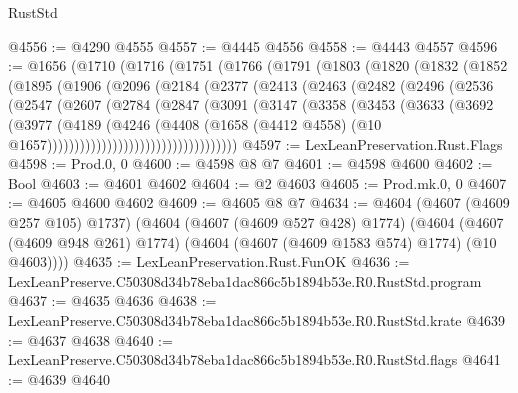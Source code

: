 \begin{lexlean}{RustStd}
\begin{coremodule}
@4556 := @4290 @4555
@4557 := @4445 @4556
@4558 := @4443 @4557
@4596 := @1656
    (@1710
      (@1716
        (@1751
          (@1766
            (@1791
              (@1803
                (@1820
                  (@1832
                    (@1852
                      (@1895
                        (@1906
                          (@2096
                            (@2184
                              (@2377
                                (@2413
                                  (@2463
                                    (@2482
                                      (@2496
                                        (@2536
                                          (@2547
                                            (@2607
                                              (@2784
                                                (@2847
                                                  (@3091
                                                    (@3147
                                                      (@3358
                                                        (@3453
                                                          (@3633
                                                            (@3692
                                                              (@3977
                                                                (@4189
                                                                  (@4246
                                                                    (@4408
                                                                      (@1658
                                                                        (@4412 @4558)
                                                                        (@10
                                                                          @1657)))))))))))))))))))))))))))))))))))
@4597 := LexLeanPreservation.Rust.Flags
@4598 := Prod.{0, 0}
@4600 := @4598 @8 @7
@4601 := @4598 @4600
@4602 := Bool
@4603 := @4601 @4602
@4604 := @2 @4603
@4605 := Prod.mk.{0, 0}
@4607 := @4605 @4600 @4602
@4609 := @4605 @8 @7
@4634 := @4604
    (@4607 (@4609 @257 @105) @1737)
    (@4604
      (@4607 (@4609 @527 @428) @1774)
      (@4604 (@4607 (@4609 @948 @261) @1774) (@4604 (@4607 (@4609 @1583 @574) @1774) (@10 @4603))))
@4635 := LexLeanPreservation.Rust.FunOK
@4636 := LexLeanPreserve.C50308d34b78eba1dac866c5b1894b53e.R0.RustStd.program
@4637 := @4635 @4636
@4638 := LexLeanPreserve.C50308d34b78eba1dac866c5b1894b53e.R0.RustStd.krate
@4639 := @4637 @4638
@4640 := LexLeanPreserve.C50308d34b78eba1dac866c5b1894b53e.R0.RustStd.flags
@4641 := @4639 @4640

\end{coremodule}
\end{lexlean}
